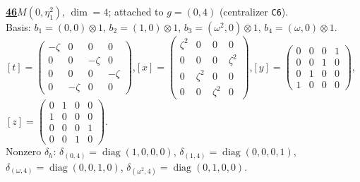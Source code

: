 \begin{samepage}\noindent\textbf{\underline{46}}\quad $M(0,\eta^{2}_{1})$, $\dim=4$; attached to $g=(0,4)$ (centralizer \texttt{C6}).\\
Basis: $b_{1}=(0,0)\otimes 1$, $b_{2}=(1,0)\otimes 1$, $b_{3}=(\omega^2,0)\otimes 1$, $b_{4}=(\omega,0)\otimes 1$.\\
$[t]=\left(\begin{smallmatrix} -\zeta & 0 & 0 & 0 \\ 0 & 0 & -\zeta & 0 \\ 0 & 0 & 0 & -\zeta \\ 0 & -\zeta & 0 & 0 \end{smallmatrix}\right)$,\quad $[x]=\left(\begin{smallmatrix} \zeta^2 & 0 & 0 & 0 \\ 0 & 0 & 0 & \zeta^2 \\ 0 & \zeta^2 & 0 & 0 \\ 0 & 0 & \zeta^2 & 0 \end{smallmatrix}\right)$,\quad $[y]=\left(\begin{smallmatrix} 0 & 0 & 0 & 1 \\ 0 & 0 & 1 & 0 \\ 0 & 1 & 0 & 0 \\ 1 & 0 & 0 & 0 \end{smallmatrix}\right)$,\quad $[z]=\left(\begin{smallmatrix} 0 & 1 & 0 & 0 \\ 1 & 0 & 0 & 0 \\ 0 & 0 & 0 & 1 \\ 0 & 0 & 1 & 0 \end{smallmatrix}\right)$.\\
Nonzero $\delta_h$: $\delta_{(0,4)}=\operatorname{diag}(1,0,0,0)$, $\delta_{(1,4)}=\operatorname{diag}(0,0,0,1)$, $\delta_{(\omega,4)}=\operatorname{diag}(0,0,1,0)$, $\delta_{(\omega^2,4)}=\operatorname{diag}(0,1,0,0)$.\end{samepage}
\medskip

